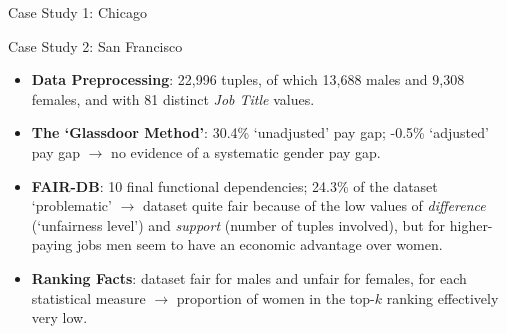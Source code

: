 \documentclass[usenames,dvipsnames]{beamer}
\begin{document}
    
    \begin{frame}{Case Study 1: Chicago}
        \begin{figure}
            \hfill
        \end{figure}
    \end{frame}
    
    
    \begin{frame}{Case Study 2: San Francisco}
        \begin{itemize}
            \item \textbf{Data Preprocessing}: 22,996 tuples, of which 13,688 males and 9,308 females, and with 81 distinct \textit{Job Title} values.\newline
            \item \textbf{The `Glassdoor Method'}: 30.4\% `unadjusted' pay gap; -0.5\% `adjusted' pay gap $\rightarrow$ no evidence of a systematic gender pay gap.
            \item \textbf{FAIR-DB}: 10 final functional dependencies; 24.3\% of the dataset `problematic' $\rightarrow$ dataset quite fair because of the low values of \textit{difference} (`unfairness level') and \textit{support} (number of tuples involved), but for higher-paying jobs men seem to have an economic advantage over women.
            \item \textbf{Ranking Facts}: dataset fair for males and unfair for females, for each statistical measure $\rightarrow$ proportion of women in the top-\(k\) ranking effectively very low.
        \end{itemize}
    \end{frame}
    
\end{document}
